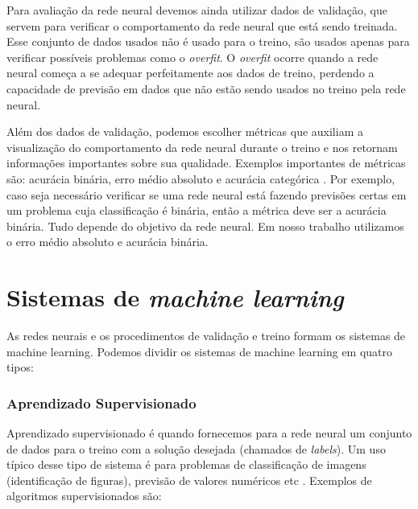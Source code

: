 \documentclass[a4paper,12pt,oneside]{book}
\begin{document}
\par Para avaliação da rede neural devemos ainda utilizar dados de validação, que servem para verificar o comportamento da rede neural que está sendo treinada. Esse conjunto de dados usados não é usado para o treino, são usados apenas para verificar possíveis problemas como o \textit{overfit}. O \textit{overfit} ocorre quando a rede neural começa a se adequar perfeitamente aos dados de treino, perdendo a capacidade de previsão em dados que não estão sendo usados no treino pela rede neural.

\par Além dos dados de validação, podemos escolher métricas que auxiliam a visualização do comportamento da rede neural durante o treino e nos retornam informações importantes sobre sua qualidade. Exemplos importantes de métricas são: acurácia binária, erro médio absoluto e acurácia categórica \cite{metrics}. Por exemplo, caso seja necessário verificar se uma rede neural está fazendo previsões certas em um problema cuja classificação é binária, então a métrica deve ser a acurácia binária. Tudo depende do objetivo da rede neural. Em nosso trabalho utilizamos o erro médio absoluto e acurácia binária.

\section{Sistemas de \textit{machine learning}}

\par As redes neurais e os procedimentos de validação e treino formam os sistemas de machine learning. Podemos dividir os sistemas de machine learning em quatro tipos:

\subsubsection*{Aprendizado Supervisionado}

\par Aprendizado supervisionado é quando fornecemos para a rede neural um conjunto de dados para o treino com a solução desejada (chamados de \textit{labels}). Um uso típico desse tipo de sistema é para problemas de classificação de imagens (identificação de figuras), previsão de valores numéricos etc \cite{mlbook}. Exemplos de algoritmos supervisionados são:
\end{document}
